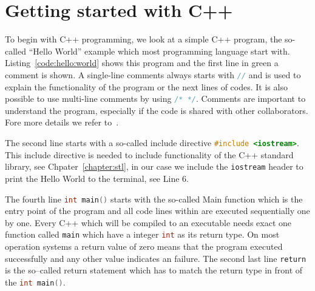 \section{Getting started with C++}
To begin with C++ programming, we look at a simple C++ program, the so-called ``Hello World'' example which most programming language start with. Listing~\ref{code:hello:world} shows this program and the first line in green a comment is shown. A  single-line comments always starts with \lstinline[language=C++]|//| and is used to explain the functionality of the program or the next lines of codes. It is also possible to use multi-line comments by using \lstinline[language=C++]{/* */}. Comments are important to understand the program, especially if the code is shared with other collaborators. Fore more details we refer to~\cite{kernighan1974elements}.

The second line starts with a so-called include directive \lstinline[language=C++]{#include <iostream>}. This include directive is needed to include functionality of the C++ standard library, see Chpater~\ref{chapter:stl}, in our case we include the \lstinline|iostream| header to print the Hello World to the terminal, see Line 6.

The fourth line \lstinline[language=C++]{int main()} starts with the so-called Main function which is the entry point of the program and all code lines within are executed sequentially one by one. Every C++ which will be compiled to an executable needs exact one function called \lstinline[language=C++]|main| which have a integer \lstinline[language=C++]{int} as its return type. On most operation systems a return value of zero means that the program executed successfully and any other value indicates an failure. The second last line \lstinline[]|return| is the so--called return statement which has to match the return type in front of the \lstinline[language=C++]{int main()}.




